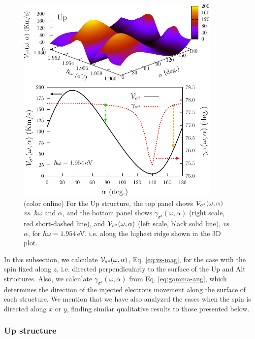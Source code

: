 \documentclass[floatfix,prb,aps,superscriptaddress,showpacs,11pt,preprint,letterpaper]{revtex4}
\def\tama{10cm}
\begin{document}
\begin{figure}[t]
\centering
\includegraphics[width=\tama]{fig5}
\caption{(color online) For the Up structure, the top panel shows ${\cal
V}_{\sigma^\mathrm{z}} (\omega,\alpha)$ {\it vs.} $\hbar\omega$ and $\alpha$,
and the bottom panel shows $\gamma_{\sigma^\mathrm{z}}
(\omega,\alpha)$ 
(right scale, red short-dashed line), and ${\cal V}_{\sigma^\mathrm{z}}
(\omega,\alpha)$ (left scale, black solid line), {\it vs.} $\alpha$, for
$\hbar\omega=1.954$\,eV, i.e. along the highest ridge shown in the 3D plot. }
\label{fig:up-vsz-w2}
\end{figure}

In this subsection, we calculate ${\cal V}_{\sigma^\mathrm{z}}(\omega,\alpha)$,
Eq. \eqref{eq:vs-mag}, for the case with the spin fixed along $z$, i.e.
directed perpendicularly to the surface of the Up and Alt structures. Also, we
calculate $\gamma_{\sigma^\mathrm{z}}(\omega,\alpha)$ from Eq. 
\eqref{eq:gamma-ang}, which determines the direction  of the injected 
electrons movement along the surface of  each structure. We mention that we
have also  analyzed the cases when the spin  is directed along $x$ or
$y$, finding similar qualitative results to those presented below.

\subsubsection{Up structure}\label{up:fs}
\end{document}
